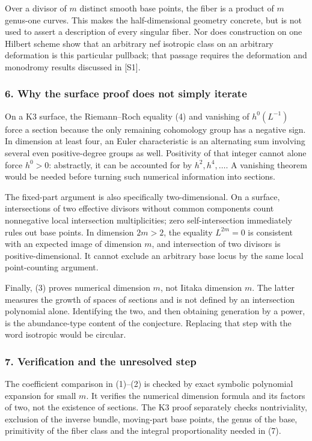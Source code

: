 \documentclass[11pt]{article}
\begin{document}
Over a divisor of $m$ distinct smooth base points, the fiber is a product of $m$ genus-one curves. This makes the half-dimensional geometry concrete, but is not used to assert a description of every singular fiber. Nor does construction on one Hilbert scheme show that an arbitrary nef isotropic class on an arbitrary deformation is this particular pullback; that passage requires the deformation and monodromy results discussed in [S1].

\subsubsection{6. Why the surface proof does not simply iterate}
On a K3 surface, the Riemann--Roch equality (4) and vanishing of $h^0(L^{-1})$ force a section because the only remaining cohomology group has a negative sign. In dimension at least four, an Euler characteristic is an alternating sum involving several even positive-degree groups as well. Positivity of that integer cannot alone force $h^0>0$: abstractly, it can be accounted for by $h^2,h^4,\ldots$. A vanishing theorem would be needed before turning such numerical information into sections.

The fixed-part argument is also specifically two-dimensional. On a surface, intersections of two effective divisors without common components count nonnegative local intersection multiplicities; zero self-intersection immediately rules out base points. In dimension $2m>2$, the equality $L^{2m}=0$ is consistent with an expected image of dimension $m$, and intersection of two divisors is positive-dimensional. It cannot exclude an arbitrary base locus by the same local point-counting argument.

Finally, (3) proves numerical dimension $m$, not Iitaka dimension $m$. The latter measures the growth of spaces of sections and is not defined by an intersection polynomial alone. Identifying the two, and then obtaining generation by a power, is the abundance-type content of the conjecture. Replacing that step with the word isotropic would be circular.

\subsubsection{7. Verification and the unresolved step}
The coefficient comparison in (1)--(2) is checked by exact symbolic polynomial expansion for small $m$. It verifies the numerical dimension formula and its factors of two, not the existence of sections. The K3 proof separately checks nontriviality, exclusion of the inverse bundle, moving-part base points, the genus of the base, primitivity of the fiber class and the integral proportionality needed in (7).
\end{document}

